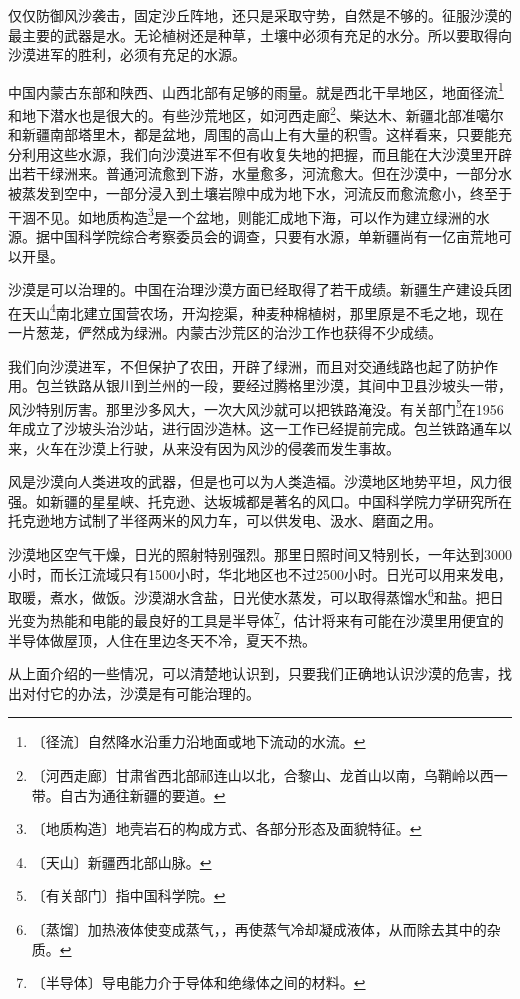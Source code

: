 \documentclass[12pt,UTF-8,openany]{ctexbook}
\begin{document}
\begin{large}
    仅仅防御风沙袭击，固定沙丘阵地，还只是采取守势，自然是不够的。征服沙漠的最主要的武器是水。无论植树还是种草，土壤中必须有充足的水分。所以要取得向沙漠进军的胜利，必须有充足的水源。
    
    中国内蒙古东部和陕西、山西北部有足够的雨量。就是西北干旱地区，地面径流\footnote{〔径流〕自然降水沿重力沿地面或地下流动的水流。}和地下潜水也是很大的。有些沙荒地区，如河西走廊\footnote{〔河西走廊〕甘肃省西北部祁连山以北，合黎山、龙首山以南，乌鞘岭以西一带。自古为通往新疆的要道。}、柴达木、新疆北部准噶尔和新疆南部塔里木，都是盆地，周围的高山上有大量的积雪。这样看来，只要能充分利用这些水源，我们向沙漠进军不但有收复失地的把握，而且能在大沙漠里开辟出若干绿洲来。普通河流愈到下游，水量愈多，河流愈大。但在沙漠中，一部分水被蒸发到空中，一部分浸入到土壤岩隙中成为地下水，河流反而愈流愈小，终至于干涸不见。如地质构造\footnote{〔地质构造〕地壳岩石的构成方式、各部分形态及面貌特征。}是一个盆地，则能汇成地下海，可以作为建立绿洲的水源。据中国科学院综合考察委员会的调查，只要有水源，单新疆尚有一亿亩荒地可以开垦。
    
    沙漠是可以治理的。中国在治理沙漠方面已经取得了若干成绩。新疆生产建设兵团在天山\footnote{〔天山〕新疆西北部山脉。}南北建立国营农场，开沟挖渠，种麦种棉植树，那里原是不毛之地，现在一片葱茏，俨然成为绿洲。内蒙古沙荒区的治沙工作也获得不少成绩。
    
    我们向沙漠进军，不但保护了农田，开辟了绿洲，而且对交通线路也起了防护作用。包兰铁路从银川到兰州的一段，要经过腾格里沙漠，其间中卫县沙坡头一带，风沙特别厉害。那里沙多风大，一次大风沙就可以把铁路淹没。有关部门\footnote{〔有关部门〕指中国科学院。}在1956年成立了沙坡头治沙站，进行固沙造林。这一工作已经提前完成。包兰铁路通车以来，火车在沙漠上行驶，从来没有因为风沙的侵袭而发生事故。
    
    风是沙漠向人类进攻的武器，但是也可以为人类造福。沙漠地区地势平坦，风力很强。如新疆的星星峡、托克逊、达坂城都是著名的风口。中国科学院力学研究所在托克逊地方试制了半径两米的风力车，可以供发电、汲水、磨面之用。
    
    沙漠地区空气干燥，日光的照射特别强烈。那里日照时间又特别长，一年达到3000小时，而长江流域只有1500小时，华北地区也不过2500小时。日光可以用来发电，取暖，煮水，做饭。沙漠湖水含盐，日光使水蒸发，可以取得蒸馏水\footnote{〔蒸馏〕加热液体使变成蒸气，，再使蒸气冷却凝成液体，从而除去其中的杂质。}和盐。把日光变为热能和电能的最良好的工具是半导体\footnote{〔半导体〕导电能力介于导体和绝缘体之间的材料。}，估计将来有可能在沙漠里用便宜的半导体做屋顶，人住在里边冬天不冷，夏天不热。
    
    从上面介绍的一些情况，可以清楚地认识到，只要我们正确地认识沙漠的危害，找出对付它的办法，沙漠是有可能治理的。
    
\end{large}
\end{document}

